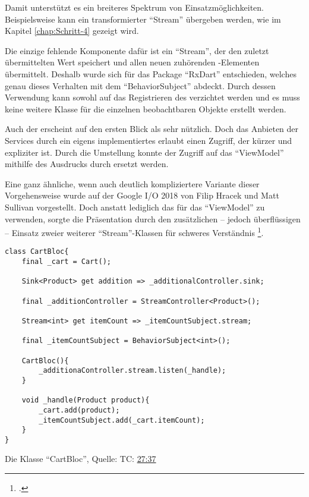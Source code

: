Damit unterstützt es ein breiteres Spektrum von Einsatzmöglichkeiten.
Beispielsweise kann ein transformierter \enquote{Stream} übergeben werden, wie im Kapitel \ref{chap:Schritt-4} gezeigt wird.

Die einzige fehlende Komponente dafür ist ein \enquote{Stream},
der den zuletzt übermittelten Wert speichert und allen neuen zuhörenden -Elementen übermittelt.
Deshalb wurde sich für das Package \enquote{RxDart} entschieden,
welches genau dieses Verhalten mit dem \enquote{BehaviorSubject} abdeckt.
Durch dessen Verwendung kann sowohl auf das Registrieren des  verzichtet werden
und es muss keine weitere Klasse für die einzelnen beobachtbaren Objekte erstellt werden.

Auch der  erscheint auf den ersten Blick als sehr nützlich.
Doch das Anbieten der Services durch ein eigens implementiertes  erlaubt einen Zugriff,
der kürzer und expliziter ist.
Durch die Umstellung konnte der Zugriff auf das \enquote{ViewModel} mithilfe des Ausdrucks  durch  ersetzt werden.

Eine ganz ähnliche, wenn auch deutlich kompliziertere Variante dieser Vorgehensweise wurde auf der Google I/O 2018 von Filip Hracek und Matt Sullivan vorgestellt.
Doch anstatt lediglich das  für das \enquote{ViewModel} zu verwenden,
sorgte die Präsentation durch den zusätzlichen -- jedoch überflüssigen -- Einsatz zweier weiterer \enquote{Stream}-Klassen für schweres Verständnis \Lst{\ref{lst:CartBloc}}\footcite[][TC: \href{https://youtu.be/RS36gBEp8OI?t=1657}{27:37}]{GoogleIO18}.

\ifIncludeFigures
  \begin{listing}[h]
    \begin{verbatim}
class CartBloc{
    final _cart = Cart();

    Sink<Product> get addition => _additionalController.sink;

    final _additionController = StreamController<Product>();

    Stream<int> get itemCount => _itemCountSubject.stream;

    final _itemCountSubject = BehaviorSubject<int>();

    CartBloc(){
        _additionaController.stream.listen(_handle);
    }

    void _handle(Product product){
        _cart.add(product);
        _itemCountSubject.add(_cart.itemCount);
    }
}
\end{verbatim}
    \caption[Die Klasse \enquote{CartBloc}]{Die Klasse \enquote{CartBloc}, Quelle: \cite{GoogleIO18} TC: \href{https://youtu.be/RS36gBEp8OI?t=1657}{27:37}}
    \label{lst:CartBloc}
  \end{listing}
\fi

